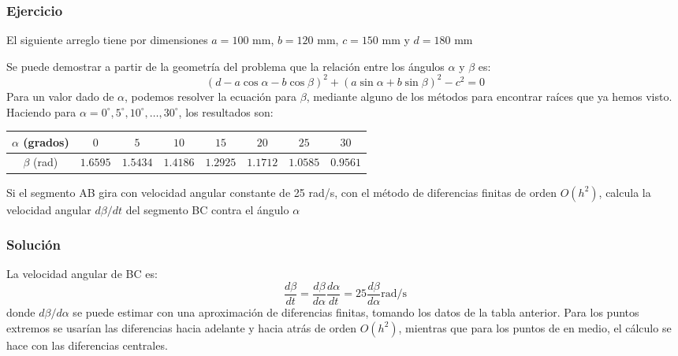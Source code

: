 \begin{frame}
\frametitle{Ejercicio}
El siguiente arreglo tiene por dimensiones $a=100$ mm, $b=120$ mm, $c=150$ mm y $d=180$ mm
\begin{center}
\end{center}
\end{frame}
\begin{frame}
Se puede demostrar a partir de la geometría del problema que la relación entre los ángulos $\alpha$ y $\beta$ es:
\[ (d - a \cos \alpha - b \cos \beta)^{2} + (a \sin \alpha + b \sin \beta)^{2} - c^{2} = 0\]
Para un valor dado de $\alpha$, podemos resolver la ecuación para $\beta$, mediante alguno de los métodos para encontrar raíces que ya hemos visto. Haciendo para $\alpha=0^{\circ}, 5^{\circ}, 10^{\circ},\ldots, 30^{\circ}$, los resultados son:
\begin{center}
\fontsize{10}{10}\selectfont
\begin{tabular}{c | c | c | c | c | c | c | c}
$\alpha$ (grados) & $0$ & $5$ & $10$ & $15$ & $20$ & $25$ & $30$  \\ \hline
$\beta$ (rad) & $1.6595$ & $1.5434$ & $1.4186$ & $1.2925$ & $1.1712$ & $1.0585$ & $0.9561$
\end{tabular}
\end{center}
\end{frame}
\begin{frame}
Si el segmento AB gira con velocidad angular constante de 25 rad/s, con el método de diferencias finitas de orden $O(h^{2})$, calcula la velocidad angular $d\beta / dt$ del segmento BC contra el ángulo $\alpha$
\end{frame}
\begin{frame}
\frametitle{Solución}
La velocidad angular de BC es:
\[ \dfrac{d\beta}{dt} = \dfrac{d\beta}{d\alpha}\dfrac{d\alpha}{dt} = 25\dfrac{d\beta}{d\alpha} \text{rad/s}\]
donde $d\beta/d\alpha$ se puede estimar con una aproximación de diferencias finitas, tomando los datos de la tabla anterior. Para los puntos extremos se usarían las diferencias hacia adelante y hacia atrás de orden $O(h^{2})$, mientras que para los puntos de en medio, el cálculo se hace con las diferencias centrales.
\end{frame}
